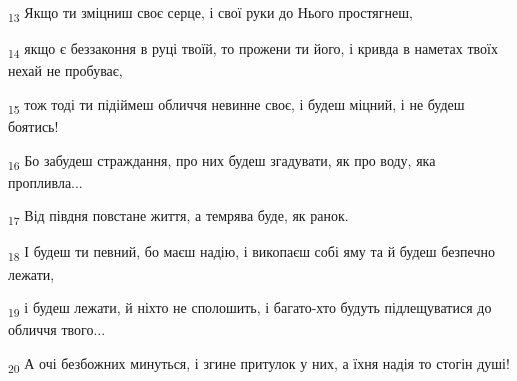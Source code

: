 \begin{tcolorbox}
\textsubscript{13} Якщо ти зміцниш своє серце, і свої руки до Нього простягнеш,
\end{tcolorbox}
\begin{tcolorbox}
\textsubscript{14} якщо є беззаконня в руці твоїй, то прожени ти його, і кривда в наметах твоїх нехай не пробуває,
\end{tcolorbox}
\begin{tcolorbox}
\textsubscript{15} тож тоді ти підіймеш обличчя невинне своє, і будеш міцний, і не будеш боятись!
\end{tcolorbox}
\begin{tcolorbox}
\textsubscript{16} Бо забудеш страждання, про них будеш згадувати, як про воду, яка пропливла...
\end{tcolorbox}
\begin{tcolorbox}
\textsubscript{17} Від півдня повстане життя, а темрява буде, як ранок.
\end{tcolorbox}
\begin{tcolorbox}
\textsubscript{18} І будеш ти певний, бо маєш надію, і викопаєш собі яму та й будеш безпечно лежати,
\end{tcolorbox}
\begin{tcolorbox}
\textsubscript{19} і будеш лежати, й ніхто не сполошить, і багато-хто будуть підлещуватися до обличчя твого...
\end{tcolorbox}
\begin{tcolorbox}
\textsubscript{20} А очі безбожних минуться, і згине притулок у них, а їхня надія то стогін душі!
\end{tcolorbox}
